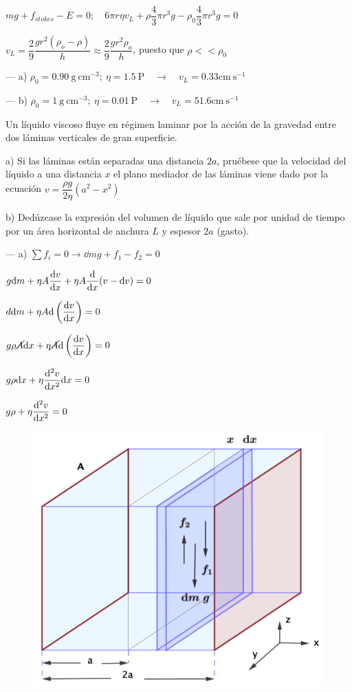 $mg+f_{stokes}-E=0;\quad 6\pi r \eta v_L+\rho \dfrac 4 3 \pi r^3 g-\rho_0 \dfrac 4 3 \pi r^3 g=0$

$v_L=\dfrac 2 9 \dfrac{g r^2 (\rho_o-\rho)}{h} \approx \dfrac 2 9 \dfrac{gr^2 \rho_o}{h}$, puesto que $\rho << \rho_0$

--- a) $\rho_0=0.90\ \mathrm{g\ cm}^{-3};\ \eta=1.5 \ \mathrm{P} \quad \to \quad v_L=0.33 \mathrm{cm\ s}^{-1}$

--- b) $\rho_0=1\ \mathrm{g\ cm}^{-3};\ \eta=0.01 \ \mathrm{P} \quad \to \quad v_L=51.6 \mathrm{cm\ s}^{-1}$

\begin{prob}
Un líquido viscoso fluye en régimen laminar por la acción de la gravedad entre dos láminas verticales de gran superficie.

a) Si las láminas están separadas una distancia $2a$, pruébese que la velocidad del líquido a una distancia $x$ el plano mediador de las láminas viene dado por la ecuación $v=\dfrac{\rho g}{2 \eta}(a^2-x^2)$	

b) Dedúzcase la expresión del volumen de líquido que sale por unidad de tiempo por un área horizontal de anchura $L$ y espesor $2a$ (gasto).
\end{prob}
\begin{multicols}{2}
--- a) $\sum f_i=0 \to \dd m g+f_1-f_2=0$

$\displaystyle g\dd m +\eta A\dv{v}{x} + \eta A \dv{x} (v-\dd v)=0$

$\displaystyle d\dd m +\eta A \dd \left( \dv{v}{x} \right)=0$

$\displaystyle g \rho \cancel{A} \dd x + \eta \cancel{A} \dd \left( \dv{v}{x} \right)=0$

$\displaystyle g \rho  \dd x + \eta  \dv[2]{v}{x} \dd x=0$

$\displaystyle g \rho   + \eta  \dv[2]{v}{x}=0$
\begin{figure}[H]
	\centering
	\includegraphics[width=.4\textwidth]{imagenes/imagenes18/T18IM18.png}
	\end{figure}	
\end{multicols}

